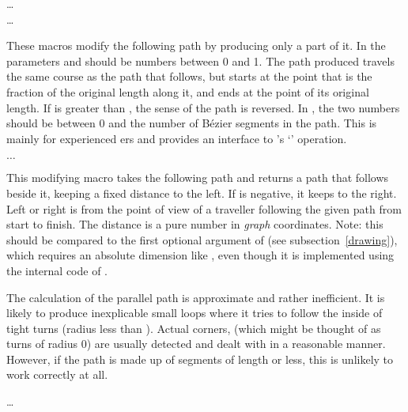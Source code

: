 \documentclass[letterpaper]{article}
\begin{document}
\begin{cd}
\dots\\
\dots%
%
\end{cd}

These macros modify the following path by producing only a part of it. In
 the parameters  and  should be
numbers between 0 and 1. The path produced travels the same course as
the path that follows, but starts at the point that is the fraction
 of the original length along it, and ends at the point
 of its original length. If  is greater than
, the sense of the path is reversed. In , the
two numbers should be between 0 and the number of B\'ezier segments in
the path. This is mainly for experienced \MF{}ers and provides an \mfp{}
interface to \MF{}'s `' operation.

\begin{cd}
$\ldots$
\end{cd}

This modifying macro takes the following path and returns a path that
follows beside it, keeping a fixed distance  to the left. If
 is negative, it keeps to the right. Left or right is from
the point of view of a traveller following the given path from start to
finish. The distance is a pure number in \emph{graph} coordinates. Note:
this should be compared to the first optional argument of
 (see subsection~\ref{drawing}), which requires an
absolute dimension like \dim{2pt}, even though it is implemented using
the internal code of .

The calculation of the parallel path is approximate and rather
inefficient. It is likely to produce inexplicable small loops where it
tries to follow the inside of tight turns (radius less than
). Actual corners, (which might be thought of as turns of
radius $0$) are usually detected and dealt with in a reasonable manner.
However, if the path is made up of segments of length  or
less, this is unlikely to work correctly at all.

\begin{cd}
\dots%
\end{cd}
\end{document}
